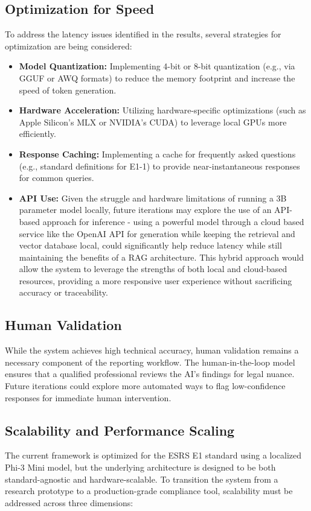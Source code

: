 \documentclass[12pt]{article}
\begin{document}
\subsection{Optimization for Speed}
To address the latency issues identified in the results, several strategies for optimization are being considered:
\begin{itemize}
    \item \textbf{Model Quantization:} Implementing 4-bit or 8-bit quantization (e.g., via GGUF or AWQ formats) to reduce the memory footprint and increase the speed of token generation.
    \item \textbf{Hardware Acceleration:} Utilizing hardware-specific optimizations (such as Apple Silicon's MLX or NVIDIA's CUDA) to leverage local GPUs more efficiently.
    \item \textbf{Response Caching:} Implementing a cache for frequently asked questions (e.g., standard definitions for E1-1) to provide near-instantaneous responses for common queries.
    \item \textbf{API Use:} Given the struggle and hardware limitations of running a 3B parameter model locally, future iterations may explore the use of an API-based approach for inference - using a powerful model through a cloud based service like the OpenAI API for generation while keeping the retrieval and vector database local, could significantly help reduce latency while still maintaining the benefits of a RAG architecture. This hybrid approach would allow the system to leverage the strengths of both local and cloud-based resources, providing a more responsive user experience without sacrificing accuracy or traceability.

\end{itemize}


\subsection{Human Validation}
While the system achieves high technical accuracy, human validation remains a necessary component of the reporting workflow. The human-in-the-loop model ensures that a qualified professional reviews the AI’s findings for legal nuance. Future iterations could explore more automated ways to flag low-confidence responses for immediate human intervention.

\subsection{Scalability and Performance Scaling}
The current framework is optimized for the ESRS E1 standard using a localized Phi-3 Mini model, but the underlying architecture is designed to be both standard-agnostic and hardware-scalable. To transition the system from a research prototype to a production-grade compliance tool, scalability must be addressed across three dimensions:
\end{document}
